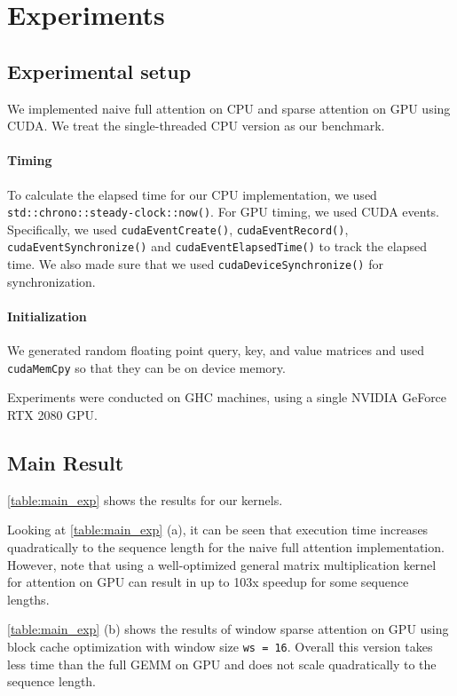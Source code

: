 \documentclass[11pt]{article}
\begin{document}


\section{Experiments}
\label{sec:main-result}
\subsection{Experimental setup}
We implemented naive full attention on CPU and sparse attention on GPU using CUDA. We treat the single-threaded CPU version as our benchmark.
\paragraph{Timing} To calculate the elapsed time for our CPU implementation, we used \texttt{std::chrono::steady-clock::now()}. For GPU timing, we used CUDA events. Specifically, we used \texttt{cudaEventCreate()}, \texttt{cudaEventRecord()}, \texttt{cudaEventSynchronize()} and \texttt{cudaEventElapsedTime()} to track the elapsed time. We also made sure that we used \texttt{cudaDeviceSynchronize()} for synchronization. 

\paragraph{Initialization} We generated random floating point query, key, and value matrices and used \texttt{cudaMemCpy} so that they can be on device memory.

Experiments were conducted on GHC machines, using a single NVIDIA GeForce RTX 2080 GPU.

\subsection{Main Result}
\autoref{table:main_exp} shows the results for our kernels.

Looking at \autoref{table:main_exp} (a), it can be seen that execution time increases quadratically to the sequence length for the naive full attention implementation. However, note that using a well-optimized general matrix multiplication kernel for attention on GPU can result in up to 103x speedup for some sequence lengths. 

\autoref{table:main_exp} (b) shows the results of window sparse attention on GPU using block cache optimization with window size \texttt{ws = 16}. Overall this version takes less time than the full GEMM on GPU and does not scale quadratically to the sequence length.
\end{document}
